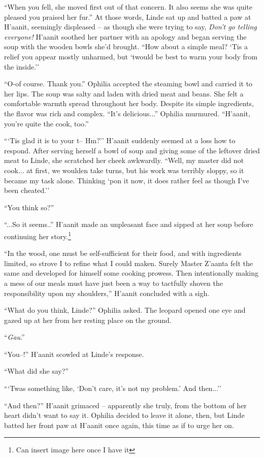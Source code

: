 ``When you fell, she moved first out of that concern. It also seems she was quite pleased you praised her fur.'' At those words, Linde sat up and batted a paw at H'aanit, seemingly displeased -- as though she were trying to say, \emph{Don't go telling everyone!} H'aanit soothed her partner with an apology and began serving the soup with the wooden bowls she'd brought. ``How about a simple meal? `Tis a relief you appear mostly unharmed, but `twould be best to warm your body from the inside.''

``O-of course. Thank you.'' Ophilia accepted the steaming bowl and carried it to her lips. The soup was salty and laden with dried meat and beans. She felt a comfortable warmth spread throughout her body. Despite its simple ingredients, the flavor was rich and complex. ``It's delicious...'' Ophilia murmured. ``H'aanit, you're quite the cook, too.''

```Tis glad it is to your t-- Hm?'' H'aanit suddenly seemed at a loss how to respond. After serving herself a bowl of soup and giving some of the leftover dried meat to Linde, she scratched her cheek awkwardly. ``Well, my master did not cook... at first, we woulden take turns, but his work was terribly sloppy, so it became my task alone. Thinking `pon it now, it does rather feel as though I've been cheated.''

``You think so?''

``...So it seems..'' H'aanit made an unpleasant face and sipped at her soup before continuing her story.\footnote{Can insert image here once I have it}

``In the wood, one must be self-sufficient for their food, and with ingredients limited, so strove I to refine what I could maken. Surely Master Z'aanta felt the same and developed for himself some cooking prowess. Then intentionally making a mess of our meals must have just been a way to tactfully shoven the responsibility upon my shoulders,'' H'aanit concluded with a sigh.

``What do you think, Linde?'' Ophilia asked. The leopard opened one eye and gazed up at her from her resting place on the ground.

``\emph{Gau}.''

``You--!'' H'aanit scowled at Linde's response.

``What did she say?''

```Twas something like, `Don't care, it's not my problem.' And then...''

``And then?'' H'aanit grimaced -- apparently she truly, from the bottom of her heart didn't want to say it. Ophilia decided to leave it alone, then, but Linde batted her front paw at H'aanit once again, this time as if to urge her on.

